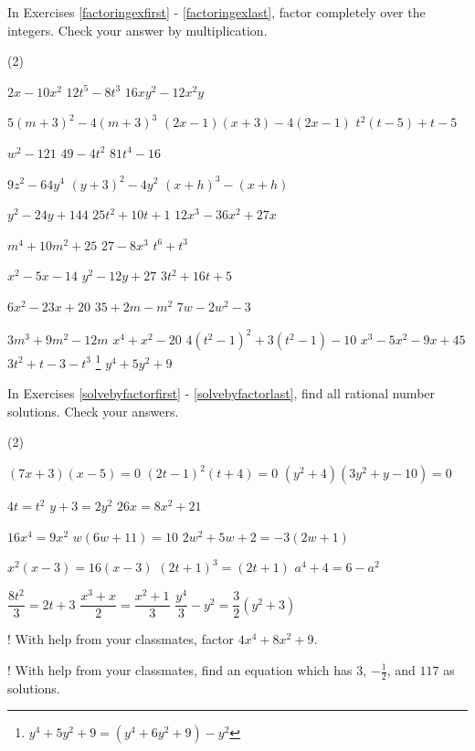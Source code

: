 \label{ExercisesforAppFactoring}

In Exercises \ref{factoringexfirst} - \ref{factoringexlast}, factor completely over the integers.  Check your answer by multiplication.

\begin{tasks}(2)

\task $2x - 10x^2$ \label{factoringexfirst}
\task $12t^5 - 8t^3$
\task $16xy^2 - 12x^2y$

\task $5(m+3)^2- 4(m+3)^3$
\task $(2x-1)(x+3) - 4(2x-1)$
\task $t^2(t-5) + t - 5$

\task $w^2 - 121$
\task $49 - 4t^2$
\task $81t^4 - 16$

\task $9z^2 - 64y^4$
\task $(y+3)^2 - 4y^2$
\task $(x+h)^3 - (x+h)$

\task $y^2 - 24y + 144$
\task $25t^2 + 10t + 1$
\task $12x^3 - 36x^2 + 27x$

\task $m^4 + 10m^2 + 25$
\task $27 - 8x^3$
\task $t^6 +t^3$

\task $x^2 - 5x - 14$
\task $y^2 - 12y + 27$
\task $3t^2 + 16t + 5$

\task $6x^2 - 23x + 20$
\task $35+2m - m^2$
\task $7w - 2w^2 - 3$

\task $3m^3 + 9m^2 - 12m$
\task $x^4 + x^2 - 20$
\task $4(t^2-1)^2 +3(t^2-1) - 10$
\task $x^3 - 5x^2 - 9x + 45$
\task $3t^2 + t - 3 - t^3$
\task\hspace{-0.1in}\footnote{$y^4 + 5y^2 + 9 = (y^4 + 6y^2 + 9) - y^2$} $y^4 + 5y^2 + 9$\label{factoringexlast}

\end{tasks}

In Exercises \ref{solvebyfactorfirst} - \ref{solvebyfactorlast},  find all rational number solutions.  Check your answers.

\begin{tasks}(2)

\task   $(7x+3)(x-5) = 0$ \label{solvebyfactorfirst}
\task   $(2t-1)^2 (t+4) = 0$
\task   $(y^2 + 4)(3y^2 +y - 10) = 0$

\task   $4t = t^2$
\task   $y+3 = 2y^2$
\task   $26x = 8x^2 + 21$  

\task $16x^4 = 9x^2$
\task $w(6w+11) = 10$
\task $2w^2 + 5w + 2 = - 3(2w+1)$

\task $x^2(x-3) = 16(x-3)$
\task $(2t+1)^3 = (2t+1)$
\task $a^4 + 4 = 6 - a^2$

\task $\dfrac{8t^2}{3} = 2t+3$
\task $\dfrac{x^3+x}{2} = \dfrac{x^2+1}{3}$
\task $\dfrac{y^4}{3} - y^2 = \dfrac{3}{2} (y^2 + 3)$ \label{solvebyfactorlast}

\task!  With help from your classmates, factor $4x^4 + 8x^2 + 9$.  

\task!  With help from your classmates, find an equation which has $3$, $-\frac{1}{2}$, and $117$ as solutions.  

\end{tasks}

